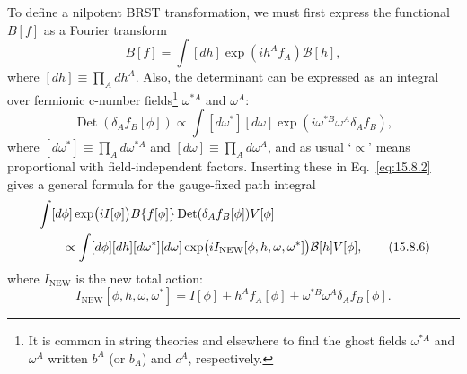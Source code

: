 To define a nilpotent BRST transformation, we must first express the functional $B[f]$ as a Fourier transform
\begin{equation}
 B[f]=\int[dh]\exp(ih^Af_A)\mathcal B[h],
 \tag{15.8.4}\label{eq:15.8.4}
\end{equation}
where $[dh]\equiv\prod_A dh^A$. Also, the determinant can be expressed as an integral over fermionic c-number fields\footnote{It is common in string theories and elsewhere to find the ghost fields $\omega^{*A}$ and $\omega^A$ written $b^A$ (or $b_A$) and $c^A$, respectively.} $\omega^{*A}$ and $\omega^A$:
\begin{equation}
 \operatorname{Det}(\delta_Af_B[\phi])\propto
 \int[d\omega^*][d\omega]\exp\left(i\omega^{*B}\omega^A\delta_Af_B\right),
 \tag{15.8.5}\label{eq:15.8.5}
\end{equation}
where $[d\omega^*]\equiv\prod_A d\omega^{*A}$ and $[d\omega]\equiv\prod_A d\omega^A$, and as usual `$\propto$' means proportional with field-independent factors. Inserting these in Eq.~\eqref{eq:15.8.2} gives a general formula for the gauge-fixed path integral
\begin{align}
 &\int[d\phi]\exp\bigl(iI[\phi]\bigr)B\{f[\phi]\}\operatorname{Det}(\delta_Af_B[\phi])V[\phi]\notag\\
 &\qquad\propto\int[d\phi][dh][d\omega^*][d\omega]
 \exp\bigl(iI_{\mathrm{NEW}}[\phi,h,\omega,\omega^*]\bigr)\mathcal B[h]V[\phi],
 \tag{15.8.6}\label{eq:15.8.6}
\end{align}
where $I_{\mathrm{NEW}}$ is the new total action:
\begin{equation}
 I_{\mathrm{NEW}}[\phi,h,\omega,\omega^*]
 =I[\phi]+h^Af_A[\phi]+\omega^{*B}\omega^A\delta_Af_B[\phi].
 \tag{15.8.7}\label{eq:15.8.7}
\end{equation}


